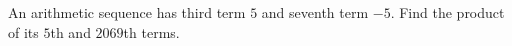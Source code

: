 An arithmetic sequence has third term $5$ and seventh term $-5$. Find the product of its $5$th and $2069$th terms.
